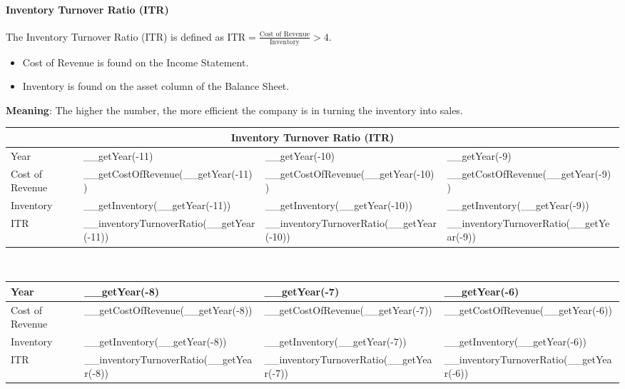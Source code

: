 \paragraph{Inventory Turnover Ratio (ITR)}

The Inventory Turnover Ratio (ITR) is defined as
$\text{ITR} = \frac{\text{Cost of Revenue}}{\text{Inventory}} > 4$.
\begin{itemize}
    \item Cost of Revenue is found on the Income Statement.
    \item Inventory is found on the asset column of the Balance Sheet.
\end{itemize}
\textbf{Meaning}: The higher the number, the more efficient the company is in
turning the inventory into sales.\\

\begin{tabularx}{\textwidth}{|X|X|X|X|}
 \hline
 \multicolumn{4}{|c|}{Inventory Turnover Ratio (ITR)} \\
 \hline
 Year                     & __getYear(-11)                           & __getYear(-10)                           & __getYear(-9)                           \\
 \hline
 Cost of Revenue          & __getCostOfRevenue(__getYear(-11))       & __getCostOfRevenue(__getYear(-10))       & __getCostOfRevenue(__getYear(-9))       \\
 Inventory                & __getInventory(__getYear(-11))           & __getInventory(__getYear(-10))           & __getInventory(__getYear(-9))           \\
 \rowcolor{lightgray} ITR & __inventoryTurnoverRatio(__getYear(-11)) & __inventoryTurnoverRatio(__getYear(-10)) & __inventoryTurnoverRatio(__getYear(-9)) \\
 \hline
\end{tabularx}\\

\begin{tabularx}{\textwidth}{|X|X|X|X|}
 \hline
 Year                     & __getYear(-8)                           & __getYear(-7)                           & __getYear(-6)                           \\
 \hline
 Cost of Revenue          & __getCostOfRevenue(__getYear(-8))       & __getCostOfRevenue(__getYear(-7))       & __getCostOfRevenue(__getYear(-6))       \\
 Inventory                & __getInventory(__getYear(-8))           & __getInventory(__getYear(-7))           & __getInventory(__getYear(-6))           \\
 \rowcolor{lightgray} ITR & __inventoryTurnoverRatio(__getYear(-8)) & __inventoryTurnoverRatio(__getYear(-7)) & __inventoryTurnoverRatio(__getYear(-6)) \\
 \hline
\end{tabularx}\\

